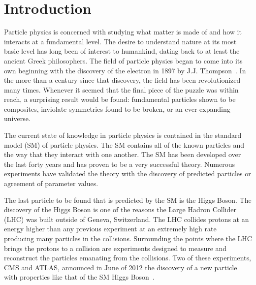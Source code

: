 \chapter{Introduction}

Particle physics is concerned with studying what matter is made of and how it interacts at a fundamental level.
The desire to understand nature at its most basic level has long been of interest to humankind, dating back to at least the ancient Greek philosophers.
The field of particle physics began to come into its own beginning with the discovery of the electron in 1897 by J.J. Thompson~\cite{griffiths2008introduction}.
In the more than a century since that discovery, the field has been revolutionized many times. Whenever it seemed that the final piece of the puzzle was within reach,
a surprising result would be found: fundamental particles shown to be composites, inviolate symmetries found to be broken,
or an ever-expanding universe.

The current state of knowledge in particle physics is contained in the standard model (SM) of particle physics. The SM contains all of the known
particles and the way that they interact with one another. The SM has been developed over the last forty years and has proven to be a very successful theory. 
Numerous experiments have validated the theory with the discovery of predicted particles or agreement of parameter values.

The last particle to be found that is predicted by the SM is the Higgs Boson.
The discovery of the Higgs Boson is one of the reasons the Large Hadron Collider (LHC) was built outside of Geneva, Switzerland. 
The LHC collides protons at an energy higher than any previous experiment at an extremely high rate~\cite{1748-0221-3-08-S08001}
producing many particles in the collisions.
Surrounding the points where the LHC brings the protons to a collision
are experiments designed to measure and reconstruct the particles emanating from the collisions. Two of these experiments, CMS and
ATLAS, announced in June of 2012 the discovery of a new particle with properties like that of the SM Higgs Boson~\cite{Chatrchyan:2013lba, Aad:2012tfa}.

